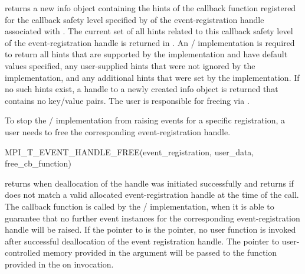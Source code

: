  returns a new info object
containing the hints of the callback function registered for the callback
safety level specified by  of the event-registration
handle associated with .  The current set
of all hints related to this callback safety level of the
event-registration handle is returned in .
An \MPI/ implementation is required to return all hints that are supported
by the implementation and have default values specified, any user-supplied
hints that were not ignored by the implementation, and any additional hints
that were set by the implementation.  If no such hints exist, a handle to a
newly created info object is returned that contains no key/value pairs.
The user is responsible for freeing  via
.


To stop the \MPI/ implementation from raising events for a specific
registration, a user needs to free the corresponding event-registration
handle.

\begin{funcdef}{MPI\_T\_EVENT\_HANDLE\_FREE}{(\mbox{event\_registration}, \mbox{user\_data}, \mbox{free\_cb\_function})}
\end{funcdef}

 returns  when
deallocation of the handle was initiated successfully and returns
 if  does
not match a valid allocated event-registration handle at the time of the call.
The callback function  is called by the \MPI/
implementation, when it is able to guarantee that no further event
instances for the corresponding event-registration handle will be raised.  If
the pointer to  is the  pointer, no
user function is invoked after successful deallocation of the event
registration handle. The pointer to user-controlled memory provided in the
 argument will be passed to the function provided in the
 on invocation.

